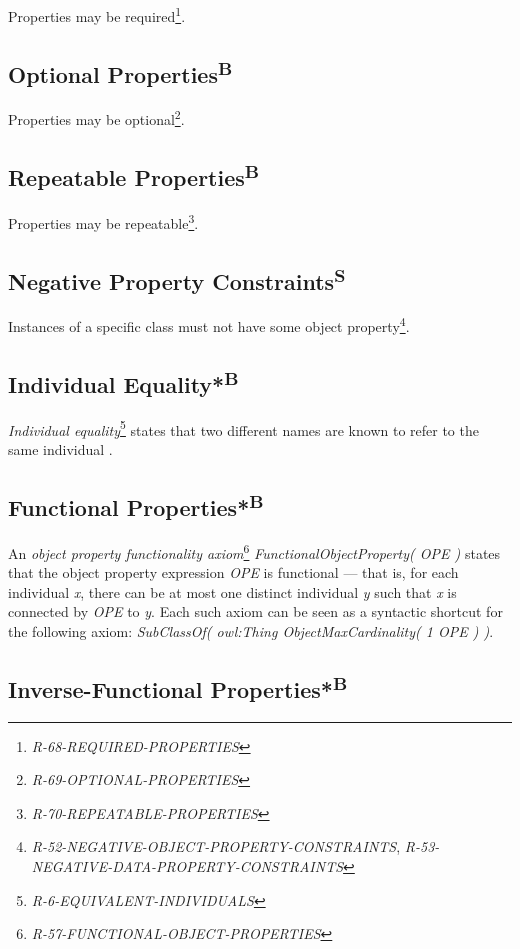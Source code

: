 \documentclass{llncs}
\begin{document}
Properties may be required\footnote{\emph{R-68-REQUIRED-PROPERTIES}}.

\subsection{Optional Properties\textsuperscript{B}}

Properties may be optional\footnote{\emph{R-69-OPTIONAL-PROPERTIES}}.

\subsection{Repeatable Properties\textsuperscript{B}}

Properties may be repeatable\footnote{\emph{R-70-REPEATABLE-PROPERTIES}}.

\subsection{Negative Property Constraints\textsuperscript{S}}

Instances of a specific class must not have some object property\footnote{\emph{R-52-NEGATIVE-OBJECT-PROPERTY-CONSTRAINTS}, \emph{R-53-NEGATIVE-DATA-PROPERTY-CONSTRAINTS}}.

\subsection{Individual Equality*\textsuperscript{B}}

\emph{Individual equality}\footnote{\emph{R-6-EQUIVALENT-INDIVIDUALS}} states that two different names are known to refer to the same individual \cite{Kroetzsch2012}.

\subsection{Functional Properties*\textsuperscript{B}}

An \emph{object property functionality axiom}\footnote{\emph{R-57-FUNCTIONAL-OBJECT-PROPERTIES}} \emph{FunctionalObjectProperty( OPE )} states that the object property expression \emph{OPE} is functional — that is, for each individual \emph{x}, there can be at most one distinct individual \emph{y} such that \emph{x} is connected by \emph{OPE} to \emph{y}. Each such axiom can be seen as a syntactic shortcut for the following axiom: \emph{SubClassOf( owl:Thing ObjectMaxCardinality( 1 OPE ) )}.

\subsection{Inverse-Functional Properties*\textsuperscript{B}}
\end{document}
